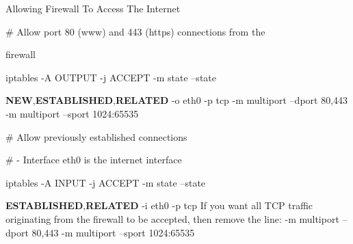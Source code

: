 \begin{frame}[t,allowframebreaks]{Allowing Firewall To Access The Internet}
  \fontsize{15}{18}\selectfont
  \vspace{0.08cm}
  {\color{CommandGreen}\ttfamily\fontsize{13.5}{16.5}\selectfont \# Allow port 80 (www) and 443 (https) connections from the\par}
  firewall\par
  \vspace{0.08cm}
  {\color{CommandGreen}\ttfamily\fontsize{13.5}{16.5}\selectfont iptables -A OUTPUT -j ACCEPT -m state --state\par}
  \textcolor{WarningColor}{\bfseries NEW},\textcolor{WarningColor}{\bfseries ESTABLISHED},\textcolor{WarningColor}{\bfseries RELATED} -o eth0 -p tcp -m multiport --dport 80,443 -m multiport --sport 1024:65535\par
  \vspace{0.08cm}
  {\color{CommandGreen}\ttfamily\fontsize{13.5}{16.5}\selectfont \# Allow previously established connections\par}
  \vspace{0.08cm}
  {\color{CommandGreen}\ttfamily\fontsize{13.5}{16.5}\selectfont \# - Interface eth0 is the internet interface\par}
  \vspace{0.08cm}
  {\color{CommandGreen}\ttfamily\fontsize{13.5}{16.5}\selectfont iptables -A INPUT -j ACCEPT -m state --state\par}
  \textcolor{WarningColor}{\bfseries ESTABLISHED},\textcolor{WarningColor}{\bfseries RELATED} -i eth0 -p tcp If you want all TCP traffic originating from the firewall to be accepted, then remove the line: -m multiport --dport 80,443 -m multiport --sport 1024:65535\par
\end{frame}
